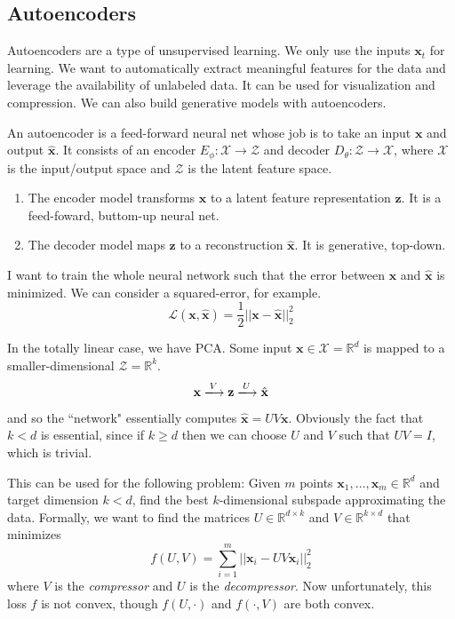 \documentclass{article}
\begin{document}
  \subsection{Autoencoders}

    Autoencoders are a type of unsupervised learning. We only use the inputs $\mathbf{x}_t$ for learning. We want to automatically extract meaningful features for the data and leverage the availability of unlabeled data. It can be used for visualization and compression. We can also build generative models with autoencoders. 

    \begin{definition}[Autoencoder]
      An autoencoder is a feed-forward neural net whose job is to take an input $\mathbf{x}$ and output $\hat{\mathbf{x}}$. It consists of an encoder $E_\phi: \mathcal{X} \rightarrow \mathcal{Z}$ and decoder $D_\theta: \mathcal{Z} \rightarrow \mathcal{X}$, where $\mathcal{X}$ is the input/output space and $\mathcal{Z}$ is the latent feature space. 

      \begin{enumerate}
        \item The encoder model transforms $\mathbf{x}$ to a latent feature representation $\mathbf{z}$. It is a feed-foward, buttom-up neural net. 
        \item The decoder model maps $\mathbf{z}$ to a reconstruction $\hat{\mathbf{x}}$. It is generative, top-down. 
      \end{enumerate}

      I want to train the whole neural network such that the error between $\mathbf{x}$ and $\hat{\mathbf{x}}$ is minimized. We can consider a squared-error, for example. 
        \[\mathcal{L}(\mathbf{x}, \hat{\mathbf{x}}) = \frac{1}{2} ||\mathbf{x} - \hat{\mathbf{x}}||_2^2\]
    \end{definition}

    In the totally linear case, we have PCA. Some input $\mathbf{x} \in \mathcal{X} = \mathbb{R}^d$ is mapped to a smaller-dimensional $\mathcal{Z} = \mathbb{R}^k$. 
    \[\mathbf{x} \xlongrightarrow[]{V} \mathbf{z} \xlongrightarrow{U} \hat{\mathbf{x}}\]
    and so the ``network" essentially computes $\hat{\mathbf{x}} = U V \mathbf{x}$. Obviously the fact that $k < d$ is essential, since if $k \geq d$ then we can choose $U$ and $V$ such that $UV = I$, which is trivial. 

    This can be used for the following problem: Given $m$ points $\mathbf{x}_1, \ldots, \mathbf{x}_m \in \mathbb{R}^d$ and target dimension $k < d$, find the best $k$-dimensional subspade approximating the data. Formally, we want to find the matrices $U \in \mathbb{R}^{d \times k}$ and $V \in \mathbb{R}^{k \times d}$ that minimizes 
    \[f(U, V) = \sum_{i=1}^m ||\mathbf{x}_i - U V \mathbf{x}_i||_2^2 \] 
    where $V$ is the \textit{compressor} and $U$ is the \textit{decompressor}. Now unfortunately, this loss $f$ is not convex, though $f(U, \cdot)$ and $f(\cdot, V)$ are both convex. 
\end{document}
